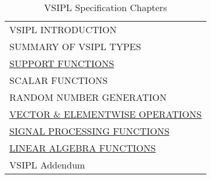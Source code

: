 \begin{table}[H]
\hypertarget{VSIPspecHead}{}
\caption{VSIPL Specification Chapters}
\label{tab:vsiplAPI}
\begin{center}
\begin{tabular}{l}
VSIPL INTRODUCTION\\
SUMMARY OF VSIPL TYPES\\
\hyperlink{vsiplAPISupport}{SUPPORT FUNCTIONS}\\
SCALAR FUNCTIONS\\
RANDOM NUMBER GENERATION\\
\hyperlink{vectorAndElementwise}{VECTOR \& ELEMENTWISE OPERATIONS}\\
\hyperlink{vsipljSignalProcessing}{SIGNAL PROCESSING FUNCTIONS}\\
\hyperlink{linearAlgebraFunctions}{LINEAR ALGEBRA FUNCTIONS}\\
VSIPL Addendum\\
\end{tabular}
\end{center}
\label{default}
\end{table}%